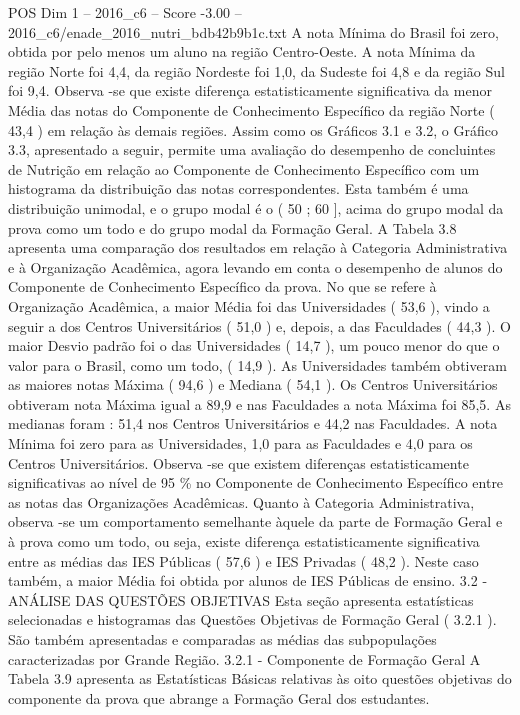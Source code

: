 \begin{textsample}{POS Dim 1 – 2016\_c6 – Score -3.00 – 2016\_c6/enade\_2016\_nutri\_bdb42b9b1c.txt}
A nota Mínima do Brasil foi zero, obtida por pelo menos um aluno na região Centro-Oeste.
A nota Mínima da região Norte foi 4,4, da região Nordeste foi 1,0, da Sudeste foi 4,8 e da região Sul foi 9,4.
Observa -se que existe diferença estatisticamente significativa da menor Média das notas do Componente de Conhecimento Específico da região Norte ( 43,4 ) em relação às demais regiões.
Assim como os Gráficos 3.1 e 3.2, o Gráfico 3.3, apresentado a seguir, permite uma avaliação do desempenho de concluintes de Nutrição em relação ao Componente de Conhecimento Específico com um histograma da distribuição das notas correspondentes.
Esta também é uma distribuição unimodal, e o grupo modal é o ( 50 ; 60 ], acima do grupo modal da prova como um todo e do grupo modal da Formação Geral.
A Tabela 3.8 apresenta uma comparação dos resultados em relação à Categoria Administrativa e à Organização Acadêmica, agora levando em conta o desempenho de alunos do Componente de Conhecimento Específico da prova.
No que se refere à Organização Acadêmica, a maior Média foi das Universidades ( 53,6 ), vindo a seguir a dos Centros Universitários ( 51,0 ) e, depois, a das Faculdades ( 44,3 ).
O maior Desvio padrão foi o das Universidades ( 14,7 ), um pouco menor do que o valor para o Brasil, como um todo, ( 14,9 ).
As Universidades também obtiveram as maiores notas Máxima ( 94,6 ) e Mediana ( 54,1 ).
Os Centros Universitários obtiveram nota Máxima igual a 89,9 e nas Faculdades a nota Máxima foi 85,5.
As medianas foram : 51,4 nos Centros Universitários e 44,2 nas Faculdades.
A nota Mínima foi zero para as Universidades, 1,0 para as Faculdades e 4,0 para os Centros Universitários.
Observa -se que existem diferenças estatisticamente significativas ao nível de 95 \% no Componente de Conhecimento Específico entre as notas das Organizações Acadêmicas.
Quanto à Categoria Administrativa, observa -se um comportamento semelhante àquele da parte de Formação Geral e à prova como um todo, ou seja, existe diferença estatisticamente significativa entre as médias das IES Públicas ( 57,6 ) e IES Privadas ( 48,2 ).
Neste caso também, a maior Média foi obtida por alunos de IES Públicas de ensino. 3.2 - ANÁLISE DAS QUESTÕES OBJETIVAS Esta seção apresenta estatísticas selecionadas e histogramas das Questões Objetivas de Formação Geral ( 3.2.1 ).
São também apresentadas e comparadas as médias das subpopulações caracterizadas por Grande Região. 3.2.1 - Componente de Formação Geral A Tabela 3.9 apresenta as Estatísticas Básicas relativas às oito questões objetivas do componente da prova que abrange a Formação Geral dos estudantes.

\end{textsample}
